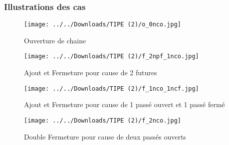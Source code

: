 \documentclass{beamer}
\begin{document}
\begin{frame}[fragile]
\begin{center}
\end{center}
\end{frame}

\begin{frame}
\frametitle{Illustrations des cas}
\begin{figure}[h]
    \begin{minipage}[c]{.46\linewidth}
        \centering
        \texttt{[image: ../../Downloads/TIPE (2)/o\_0nco.jpg]}
        \caption{Ouverture de chaine}
    \end{minipage}
    \hfill%
    \begin{minipage}[c]{.46\linewidth}
        \centering
        \texttt{[image: ../../Downloads/TIPE (2)/f\_2npf\_1nco.jpg]}
        \caption{Ajout et Fermeture pour cause de 2 futures}
    \end{minipage}
	\hfill%
    \begin{minipage}[c]{.46\linewidth}
        \centering
        \texttt{[image: ../../Downloads/TIPE (2)/f\_1nco\_1ncf.jpg]}
        \caption{Ajout et Fermeture pour cause de 1 passé ouvert et 1 passé fermé}
    \end{minipage}
\hfill%
    \begin{minipage}[c]{.46\linewidth}
        \centering
        \texttt{[image: ../../Downloads/TIPE (2)/f\_2nco.jpg]}
        \caption{Double Fermeture pour cause de deux passés ouverts}
    \end{minipage}

\end{figure}
\end{frame}
\end{document}
